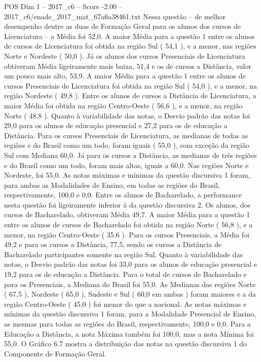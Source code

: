 \begin{textsample}{POS Dim 1 – 2017\_c6 – Score -2.00 – 2017\_c6/enade\_2017\_mat\_67a6a38461.txt}
Nessa questão – de melhor desempenho dentre as duas de Formação Geral para os alunos dos cursos de Licenciatura – a Média foi 52,0.
A maior Média para a questão 1 entre os alunos de cursos de Licenciatura foi obtida na região Sul ( 54,1 ), e a menor, nas regiões Norte e Nordeste ( 50,0 ).
Já os alunos dos cursos Presenciais de Licenciatura obtiveram Média ligeiramente mais baixa, 51,4 e os de cursos a Distância, valor um pouco mais alto, 53,9.
A maior Média para a questão 1 entre os alunos de cursos Presenciais de Licenciatura foi obtida na região Sul ( 54,0 ), e a menor, na região Nordeste ( 49,8 ).
Entre os alunos de cursos a Distância de Licenciatura, a maior Média foi obtida na região Centro-Oeste ( 56,6 ), e a menor, na região Norte ( 48,8 ).
Quanto à variabilidade das notas, o Desvio padrão das notas foi 29,0 para os alunos de educação presencial e 27,2 para os de educação a Distância.
Para os cursos Presenciais de Licenciatura, as medianas de todas as regiões e do Brasil como um todo, foram iguais ( 55,0 ), com exceção da região Sul com Mediana 60,0.
Já para os cursos a Distância, as medianas de três regiões e do Brasil como um todo, foram mais altas, iguais a 60,0.
Nas regiões Norte e Nordeste, foi 55,0.
As notas máximas e mínimas da questão discursiva 1 foram, para ambas as Modalidades de Ensino, em todas as regiões do Brasil, respectivamente, 100,0 e 0,0.
Entre os alunos de Bacharelado, a performance nesta questão foi ligeiramente inferior à da questão discursiva 2.
Os alunos, dos cursos de Bacharelado, obtiveram Média 49,7.
A maior Média para a questão 1 entre os alunos de cursos de Bacharelado foi obtida na região Norte ( 56,8 ), e a menor, na região Centro-Oeste ( 35,6 ).
Para os cursos Presenciais, a Média foi 49,2 e para os cursos a Distância, 77,5, sendo os cursos a Distância de Bacharelado participantes somente na região Sul.
Quanto à variabilidade das notas, o Desvio padrão das notas foi 33,0 para os alunos de educação presencial e 19,2 para os de educação a Distância.
Para o total de cursos de Bacharelado e para os Presenciais, a Mediana do Brasil foi 55,0.
As Medianas das regiões Norte ( 67,5 ), Nordeste ( 65,0 ), Sudeste e Sul ( 60,0 em ambas ) foram maiores e a da região Centro-Oeste ( 45,0 ) foi menor do que a nacional.
As notas máximas e mínimas da questão discursiva 1 foram, para a Modalidade Presencial de Ensino, as mesmas para todas as regiões do Brasil, respectivamente, 100,0 e 0,0.
Para a Educação a Distância, a nota Máxima também foi 100,0, mas a nota Mínima foi 55,0.
O Gráfico 6.7 mostra a distribuição das notas na questão discursiva 1 do Componente de Formação Geral.

\end{textsample}
